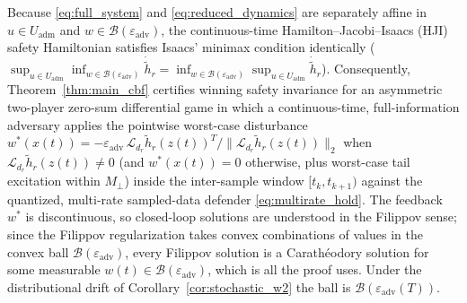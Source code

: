 \begin{remark}
\label{rem:hji_game}
Because \eqref{eq:full_system} and \eqref{eq:reduced_dynamics} are separately affine in \(u \in U_{\mathrm{adm}}\) and \(w \in \mathcal{B}(\varepsilon_{\mathrm{adv}})\), the continuous-time Hamilton--Jacobi--Isaacs (HJI) safety Hamiltonian satisfies Isaacs' minimax condition identically (\(\sup_{u \in U_{\mathrm{adm}}} \inf_{w \in \mathcal{B}(\varepsilon_{\mathrm{adv}})} \dot{\tilde{h}}_r = \inf_{w \in \mathcal{B}(\varepsilon_{\mathrm{adv}})} \sup_{u \in U_{\mathrm{adm}}} \dot{\tilde{h}}_r\)). Consequently, Theorem~\ref{thm:main_cbf} certifies winning safety invariance for an asymmetric two-player zero-sum differential game in which a continuous-time, full-information adversary applies the pointwise worst-case disturbance \(w^*(x(t)) = -\varepsilon_{\mathrm{adv}}\,\mathcal{L}_{d_r}\tilde{h}_r(z(t))^T / \|\mathcal{L}_{d_r}\tilde{h}_r(z(t))\|_2\) when \(\mathcal{L}_{d_r}\tilde{h}_r(z(t)) \neq 0\) (and \(w^*(x(t)) = 0\) otherwise, plus worst-case tail excitation within \(M_\perp\)) inside the inter-sample window \([t_k, t_{k+1})\) against the quantized, multi-rate sampled-data defender \eqref{eq:multirate_hold}. The feedback \(w^*\) is discontinuous, so closed-loop solutions are understood in the Filippov sense; since the Filippov regularization takes convex combinations of values in the convex ball \(\mathcal{B}(\varepsilon_{\mathrm{adv}})\), every Filippov solution is a Carath\'eodory solution for some measurable \(w(t) \in \mathcal{B}(\varepsilon_{\mathrm{adv}})\), which is all the proof uses. Under the distributional drift of Corollary~\ref{cor:stochastic_w2} the ball is \(\mathcal{B}(\varepsilon_{\mathrm{adv}}(T))\).
\end{remark}

